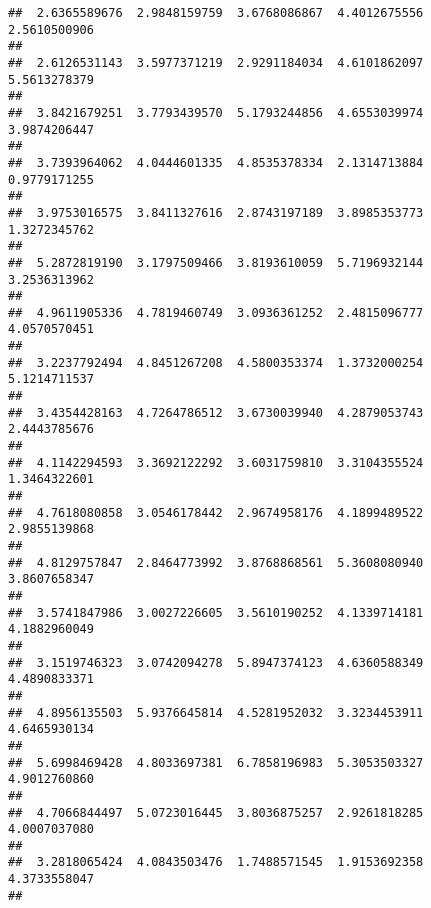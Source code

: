 \documentclass[]{article}
\begin{document}
\begin{verbatim}
##  2.6365589676  2.9848159759  3.6768086867  4.4012675556  2.5610500906 
##                                                                       
##  2.6126531143  3.5977371219  2.9291184034  4.6101862097  5.5613278379 
##                                                                       
##  3.8421679251  3.7793439570  5.1793244856  4.6553039974  3.9874206447 
##                                                                       
##  3.7393964062  4.0444601335  4.8535378334  2.1314713884  0.9779171255 
##                                                                       
##  3.9753016575  3.8411327616  2.8743197189  3.8985353773  1.3272345762 
##                                                                       
##  5.2872819190  3.1797509466  3.8193610059  5.7196932144  3.2536313962 
##                                                                       
##  4.9611905336  4.7819460749  3.0936361252  2.4815096777  4.0570570451 
##                                                                       
##  3.2237792494  4.8451267208  4.5800353374  1.3732000254  5.1214711537 
##                                                                       
##  3.4354428163  4.7264786512  3.6730039940  4.2879053743  2.4443785676 
##                                                                       
##  4.1142294593  3.3692122292  3.6031759810  3.3104355524  1.3464322601 
##                                                                       
##  4.7618080858  3.0546178442  2.9674958176  4.1899489522  2.9855139868 
##                                                                       
##  4.8129757847  2.8464773992  3.8768868561  5.3608080940  3.8607658347 
##                                                                       
##  3.5741847986  3.0027226605  3.5610190252  4.1339714181  4.1882960049 
##                                                                       
##  3.1519746323  3.0742094278  5.8947374123  4.6360588349  4.4890833371 
##                                                                       
##  4.8956135503  5.9376645814  4.5281952032  3.3234453911  4.6465930134 
##                                                                       
##  5.6998469428  4.8033697381  6.7858196983  5.3053503327  4.9012760860 
##                                                                       
##  4.7066844497  5.0723016445  3.8036875257  2.9261818285  4.0007037080 
##                                                                       
##  3.2818065424  4.0843503476  1.7488571545  1.9153692358  4.3733558047 
##                                                                       

\end{verbatim}
\end{document}
